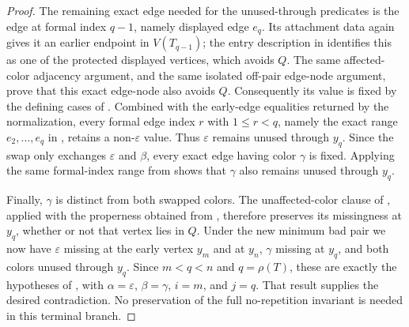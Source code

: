 \begin{proof}
The remaining exact edge needed for the unused-through predicates is
the edge at formal index \(q-1\), namely displayed edge \(e_q\).  Its
attachment data again gives it an earlier endpoint in
\(V(T_{q-1})\); the entry description in
 identifies this as one of the protected
displayed vertices, which avoids \(Q\).  The same affected-color adjacency
argument, and the same isolated off-pair edge-node argument, prove that
this exact edge-node also avoids \(Q\).  Consequently its value is fixed
by the defining cases of .  Combined
with the early-edge equalities returned by the normalization, every
formal edge index \(r\) with \(1\le r<q\), namely the exact range
\(e_2,\ldots,e_q\) in , retains a
non-\(\varepsilon\) value.  Thus \(\varepsilon\) remains unused through
\(y_q\).  Since the swap
only exchanges \(\varepsilon\) and \(\beta\), every exact edge having
color \(\gamma\) is fixed.  Applying the same formal-index range from
 shows that \(\gamma\) also remains
unused through \(y_q\).

Finally, \(\gamma\) is distinct from both swapped colors.  The
unaffected-color clause of
, applied with the
properness obtained from , therefore preserves its
missingness at \(y_q\), whether or not that vertex lies in \(Q\).  Under
the new minimum bad pair we now have \(\varepsilon\) missing at the
early vertex \(y_m\) and at \(y_n\), \(\gamma\) missing at \(y_q\),
and both colors unused through \(y_q\).  Since \(m<q<n\) and
\(q=\rho(T)\), these are exactly the hypotheses of
, with
\(\alpha=\varepsilon\), \(\beta=\gamma\), \(i=m\), and \(j=q\).
That result supplies the desired contradiction.  No preservation of the
full no-repetition invariant is needed in this terminal branch.
\end{proof}

